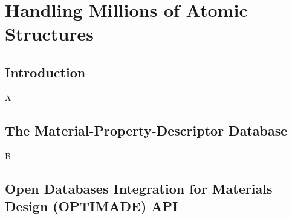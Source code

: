 \chapter{Handling Millions of Atomic Structures} \label{chap:mpdd}

\section{Introduction} \label{mpdd:sec:background}

A


\section{The Material-Property-Descriptor Database} \label{mpdd:sec:mpdd}


B



\section{Open Databases Integration for Materials Design (OPTIMADE) API} \label{mpdd:sec:optimade}





\printbibliography[heading=subbibintoc]